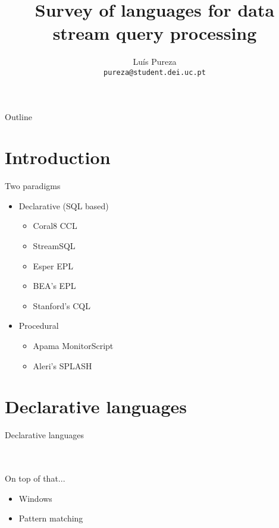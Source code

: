 \documentclass[brown, compress, mathserif]{beamer}
\title{Survey of languages for data stream query processing}
\author{Lu\'{i}s Pureza \\ \texttt{pureza@student.dei.uc.pt}}
\institute[University of Coimbra]
{
  Department of Informatics Engineering\\
  University of Coimbra, Portugal
}
\begin{document}
\begin{frame}
  \titlepage
\end{frame}

\begin{frame}{Outline}
  \tableofcontents
\end{frame}

\section{Introduction}

\begin{frame}{Two paradigms}
  \begin{itemize}
  \item Declarative (SQL based)
    \begin{itemize}
    \item Coral8 CCL
    \item StreamSQL
    \item Esper EPL
    \item BEA's EPL
    \item Stanford's CQL
    \end{itemize}
  \item Procedural
    \begin{itemize}
    \item Apama MonitorScript
    \item Aleri's SPLASH
    \end{itemize}
  \end{itemize}
\end{frame}

\section{Declarative languages}

\begin{frame}{Declarative languages}
  \hlstd{}\hspace*{\fill}\\
  \hspace*{\fill}\\
  \hlsym{= }\hlstd{}\hlstd{}\hspace*{\fill}\\
\end{frame}


\begin{frame}{On top of that...}
  \begin{itemize}
  \item Windows
  \item Pattern matching
  \end{itemize}
\end{frame}
\end{document}
